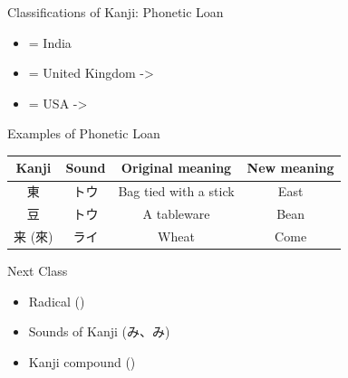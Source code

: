 \documentclass[12pt,aspectratio=169]{beamer}
\begin{document}
\begin{frame}{Classifications of Kanji: Phonetic Loan}
\begin{itemize}
names, which are similar to how Chinese use Hanzi to represent the sound of these words.
			\item {} = India
			\item {} = United Kingdom -> 
			\item {} = USA -> 
		\end{itemize}
	\end{frame}
	
	\begin{frame}{Examples of Phonetic Loan}
		\begin{table}[ht]
			\centering
			\begin{tabular}{|c|c|c|c|}
				\hline
				\textbf{Kanji} & \textbf{Sound} & \textbf{Original meaning} & \textbf{New meaning} \\
				\hline
				東 & トウ & Bag tied with a stick & East \\
				\hline
				豆 & トウ & A tableware & Bean \\
				\hline
				来 (來) & ライ & Wheat & Come \\
				\hline
			\end{tabular}
		\end{table}
	\end{frame}

	\begin{frame}{Next Class}
		\begin{itemize}
			\item Radical ()
			\item Sounds of Kanji (み、み)
			\item Kanji compound ()
		\end{itemize}
	\end{frame}
\end{document}
